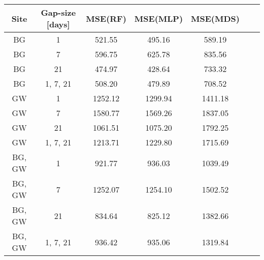 \begin{tabular}{|c|c|c|c|c|c|c|}
\toprule
Site & Gap-size [days] & MSE(RF) & MSE(MLP) & MSE(MDS) \\
\midrule
BG & 1 & 521.55 & 495.16 & 589.19 \\
BG & 7 & 596.75 & 625.78 & 835.56 \\
BG & 21 & 474.97 & 428.64 & 733.32 \\
BG & 1, 7, 21 & 508.20 & 479.89 & 708.52 \\
GW & 1 & 1252.12 & 1299.94 & 1411.18 \\
GW & 7 & 1580.77 & 1569.26 & 1837.05 \\
GW & 21 & 1061.51 & 1075.20 & 1792.25 \\
GW & 1, 7, 21 & 1213.71 & 1229.80 & 1715.69 \\
BG, GW & 1 & 921.77 & 936.03 & 1039.49 \\
BG, GW & 7 & 1252.07 & 1254.10 & 1502.52 \\
BG, GW & 21 & 834.64 & 825.12 & 1382.66 \\
BG, GW & 1, 7, 21 & 936.42 & 935.06 & 1319.84 \\
\bottomrule
\end{tabular}
